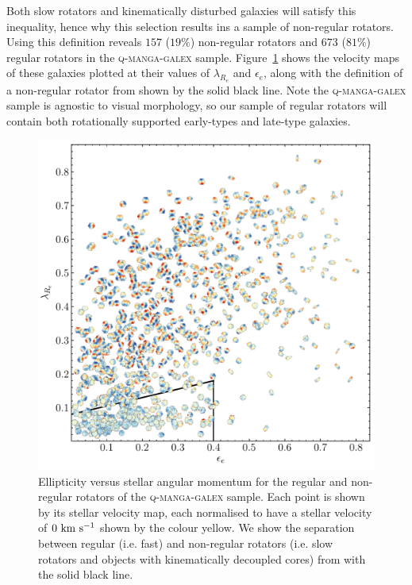 \documentclass[useAMS,usenatbib]{mn2e}
\begin{document}
Both slow rotators and kinematically disturbed galaxies will satisfy this inequality, hence why this selection results ins a sample of non-regular rotators.  Using this definition reveals $157$ ($19\%$) non-regular rotators and $673$ ($81\%$) regular rotators in the \textsc{q-manga-galex} sample. Figure~\ref{fig:evsl} shows the velocity maps of these galaxies plotted at their values of $\lambda_{R_{e}}$ and $\epsilon_e$, along with the definition of a non-regular rotator from \cite{cappellari16} shown by the solid black line. Note the \textsc{q-manga-galex} sample is agnostic to visual morphology, so our sample of regular rotators will contain both rotationally supported early-types and late-type galaxies. 

\begin{figure}
\centering
\includegraphics[width=\textwidth]{../figures/nonSF_FR_SR_sample_orig_cmap_vel_maps.pdf}
\caption{Ellipticity versus stellar angular momentum for the regular and non-regular rotators of the \textsc{q-manga-galex} sample. Each point is shown by its stellar velocity map, each normalised to have a stellar velocity of $0~\rm{km}~\rm{s}^{-1}$ shown by the colour yellow. We show the separation between regular (i.e. fast) and non-regular rotators (i.e. slow rotators and objects with kinematically decoupled cores) from \protect\cite{cappellari16} with the solid black line.}
\label{fig:evsl}
\end{figure}  
\end{document}
